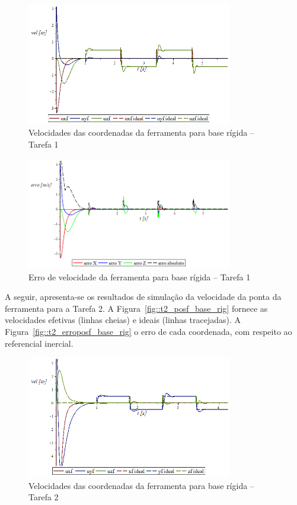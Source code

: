 \begin{figure}[h!]
	\centering 
 	\includegraphics[width=0.80\textwidth]{figs/t1_velf_base_rig}
 	\caption{Velocidades das coordenadas da ferramenta para base rígida -- Tarefa 1}
 	\label{fig::t1_velf_base_rig}
\end{figure}

\begin{figure}[h!]
	\centering 
 	\includegraphics[width=0.80\textwidth]{figs/t1_errovelf_base_rig}
 	\caption{Erro de velocidade da ferramenta para base rígida --
 	Tarefa 1}
 	\label{fig::t1_errovelf_base_rig}
\end{figure}

A seguir, apresenta-se os resultados de simulação da velocidade da ponta da
ferramenta para a Tarefa 2.
A Figura~\ref{fig::t2_posf_base_rig} fornece as velocidades efetivas (linhas
cheias) e ideais (linhas tracejadas). A Figura~\ref{fig::t2_erroposf_base_rig} o
erro de cada coordenada, com respeito ao referencial inercial.

\begin{figure}[h!]
	\centering 
 	\includegraphics[width=0.80\textwidth]{figs/t2_velf_base_rig}
 	\caption{Velocidades das coordenadas da ferramenta para base rígida -- Tarefa
 	2}
 	\label{fig::t2_velf_base_rig}
\end{figure}

